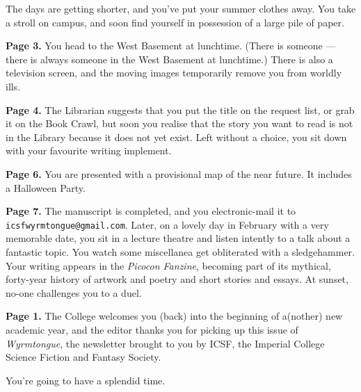 The days are getting shorter, and you've put your summer clothes
away. You take a stroll on campus, and soon find yourself in
possession of a large pile of paper.

\textbf{Page 3.}
You head to the West Basement at lunchtime. (There is someone ---
there is always someone in the West Basement at lunchtime.) There is
also a television screen, and the moving images temporarily remove you
from worldly ills.

\textbf{Page 4.}
The Librarian suggests that you put the title on the request list, or
grab it on the Book Crawl, but soon you realise that the story you
want to read is not in the Library because it does not yet exist. Left
without a choice, you sit down with your favourite writing implement.


\textbf{Page 6.}
You are presented with a provisional map of the near future. It
includes a Halloween Party.

\textbf{Page 7.}
The manuscript is completed, and you electronic-mail it
to \texttt{icsfwyrmtongue@gmail.com}. Later, on a lovely day in
February with a very memorable date, you sit in a lecture theatre and
listen intently to a talk about a fantastic topic. You watch some
miscellanea get obliterated with a sledgehammer. Your writing appears
in the \textit{Picocon Fanzine}, becoming part of its mythical,
forty-year history of artwork and poetry and short stories and
essays. At sunset, no-one challenges you to a duel.

\textbf{Page 1.}
The College welcomes you (back) into the beginning of a(nother) new
academic year, and the editor thanks you for picking up this issue
of \textit{Wyrmtongue}, the newsletter brought to you by ICSF, the
Imperial College Science Fiction and Fantasy Society.


You're going to have a splendid time.
